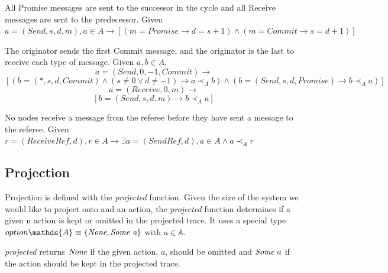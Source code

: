\documentclass[runningheads]{llncs}
\newcommand{\action}{\mathds{A}}
\newcommand{\happensbefore}{\prec_A}
\begin{document}
\begin{definition} All Promise messages are sent to the successor in the cycle and all Receive messages are sent to the predecessor. Given $a = (Send, s, d, m), a \in A \longrightarrow [(m = Promise \longrightarrow d = s + 1) \wedge (m = Commit \longrightarrow s = d + 1)]$
\end{definition}
\begin{definition} The originator sends the first Commit message, and the originator is the last to receive each type of message. Given $a, b \in A$,
$$ 
a = (Send, 0, -1, Commit) \longrightarrow 
$$
$$
[
(b = (*, s, d, Commit) \wedge (s \neq 0 \vee d \neq -1) \longrightarrow a \happensbefore b)
\wedge 
(b = (Send, s, d, Promise) \longrightarrow b \happensbefore a)
]
$$
$$
a = (Receive, 0, m) \longrightarrow 
$$
$$
[
b = (Send, s, d, m) \longrightarrow b \happensbefore a
]
$$
\end{definition}
\begin{definition} No nodes receive a message from the referee before they have sent a message to the referee. Given $r = (ReceiveRef, d), r \in A \longrightarrow \exists a = (SendRef, d), a \in A \wedge a \happensbefore r$
\end{definition}


\subsection{Projection}
Projection is defined with the \emph{projected} function. Given the size of the system we would like to project onto and an action, the \emph{projected} function determines if a given n action is kept or omitted in the projected trace. It uses a special type  
$option \action \equiv \{\emph{None}, \emph{Some a}\}$ with $a \in \action$.

\emph{projected} returns $\emph{None}$ if the given action, $a$,  should be omitted and $\emph{Some}\ a$ if the action should be kept in the projected trace.
\end{document}

